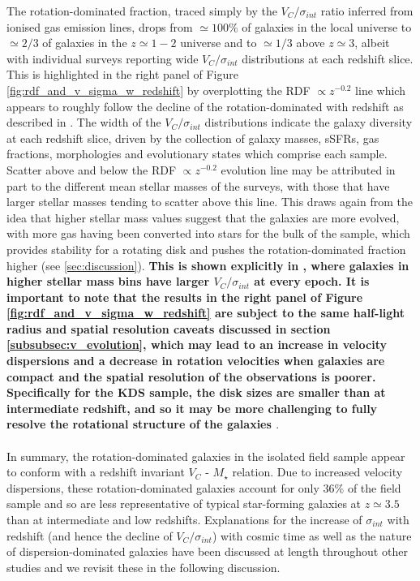 \documentclass[fleqn,usenatbib]{mnras}
\begin{document}
The rotation-dominated fraction, traced simply by the $V_{C}/\sigma_{int}$ ratio inferred from ionised gas emission lines, drops from $\simeq100\%$ of galaxies in the local universe to $\simeq2/3$ of galaxies in the $z\simeq1-2$ universe and to $\simeq1/3$ above $z\simeq3$, albeit with individual surveys reporting wide $V_{C}/\sigma_{int}$ distributions at each redshift slice.
This is highlighted in the right panel of Figure \ref{fig:rdf_and_v_sigma_w_redshift} by overplotting the RDF $\propto z^{-0.2}$ line which appears to roughly follow the decline of the rotation-dominated with redshift as described in \cite{Stott2016}. 
The width of the $V_{C}/\sigma_{int}$ distributions indicate the galaxy diversity at each redshift slice, driven by the collection of galaxy masses, sSFRs, gas fractions, morphologies and evolutionary states which comprise each sample.
Scatter above and below the RDF $\propto z^{-0.2}$ evolution line may be attributed in part to the different mean stellar masses of the surveys, with those that have larger stellar masses tending to scatter above this line.
This draws again from the idea that higher stellar mass values suggest that the galaxies are more evolved, with more gas having been converted into stars for the bulk of the sample, which provides stability for a rotating disk and pushes the rotation-dominated fraction higher (see \cref{sec:discussion}).
\textbf{This is shown explicitly in \cite{Simons2017}, where galaxies in higher stellar mass bins have larger $V_{C}/\sigma_{int}$ at every epoch.
It is important to note that the results in the right panel of Figure \ref{fig:rdf_and_v_sigma_w_redshift} are subject to the same half-light radius and spatial resolution caveats discussed in section \cref{subsubsec:v_evolution}, which may lead to an increase in velocity dispersions and a decrease in rotation velocities when galaxies are compact and the spatial resolution of the observations is poorer.
Specifically for the KDS sample, the disk sizes are smaller than at intermediate redshift, and so it may be more challenging to fully resolve the rotational structure of the galaxies \citep[e.g.][]{Newman2013}}. \\\\

In summary, the rotation-dominated galaxies in the isolated field sample appear to conform with a redshift invariant $V_{C}$ - $M_{\star}$ relation.
Due to increased velocity dispersions, these rotation-dominated galaxies account for only $36\%$ of the field sample and so are less representative of typical star-forming galaxies at $z\simeq3.5$ than at intermediate and low redshifts. 
Explanations for the increase of $\sigma_{int}$ with redshift (and hence the decline of $V_{C}/\sigma_{int}$) with cosmic time as well as the nature of dispersion-dominated galaxies have been discussed at length throughout other studies \citep[e.g][]{ForsterSchreiber2009,Law2009,Burkert2010,Newman2013,Wisnioski2015} and we revisit these in the following discussion.
\end{document}
